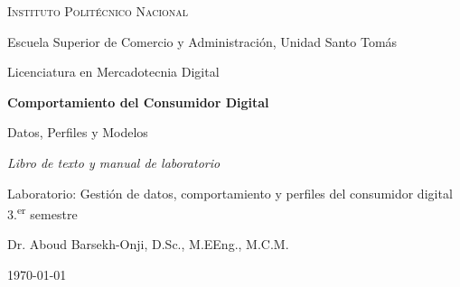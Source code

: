 \begin{titlepage}
\centering
{\scshape\large Instituto Politécnico Nacional\par}
\vspace{0.2cm}
{\large Escuela Superior de Comercio y Administración, Unidad Santo Tomás\par}
\vspace{0.2cm}
{\large Licenciatura en Mercadotecnia Digital\par}
\vspace{2cm}
{\Huge\bfseries Comportamiento del Consumidor Digital\par}
\vspace{0.4cm}
{\Large Datos, Perfiles y Modelos\par}
\vspace{0.6cm}
{\large\itshape Libro de texto y manual de laboratorio\par}
\vspace{0.4cm}
{\normalsize Laboratorio: Gestión de datos, comportamiento y perfiles del consumidor digital \\ 3.\textsuperscript{er} semestre\par}
\vfill
{\large Dr. Aboud Barsekh-Onji, D.Sc., M.EEng., M.C.M.\par}
\vspace{0.5cm}
{\normalsize \today\par}
\end{titlepage}
